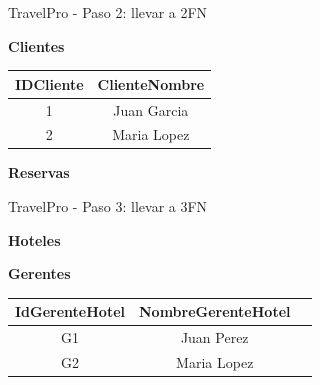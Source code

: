 \documentclass{beamer}
\begin{document}
\begin{frame}{TravelPro - Paso 2: llevar a 2FN}
    \begin{center}
    \textbf{Clientes}\\[0.1cm]
    \begin{tabular}{cc}
        \hline
        IDCliente & ClienteNombre \\
        \hline
        1 & Juan Garcia \\
        2 & Maria Lopez \\
        \hline
    \end{tabular}
    \vspace{0.4cm}

    \textbf{Reservas}\\[0.1cm]
    \vspace{0.4cm}
    \end{center}
\end{frame}

\begin{frame}{TravelPro - Paso 3: llevar a 3FN}
    \begin{center}
    \textbf{Hoteles}\\[0.1cm]
    \vspace{0.4cm}

    \textbf{Gerentes}\\[0.1cm]
    \begin{tabular}{ccc}
        \hline
        IdGerenteHotel & NombreGerenteHotel \\
        \hline
        G1 & Juan Perez \\
        G2 & Maria Lopez \\
        \hline
    \end{tabular}
    \vspace{0.4cm}
    \end{center}
\end{frame}
\end{document}
